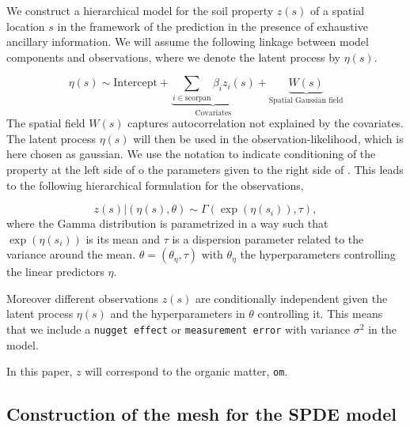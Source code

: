\documentclass[
  a4paper,
]{article}
\begin{document}
We construct a hierarchical model for the soil property \(z(s)\) of a
spatial location \(s\) in the framework of the prediction in the
presence of exhaustive ancillary information. We will assume the
following linkage between model components and observations, where we
denote the latent process by \(\eta(s)\).

\[
\eta(s) \sim {\text{Intercept}} + \underbrace{ \sum_{i\in \text{scorpan}}\beta_i z_i(s)}_{\text{Covariates} } +\underbrace{W(s)}_{\text{Spatial Gaussian field}}
\] The spatial field \(W(s)\) captures autocorrelation not explained by
the covariates. The latent process \(\eta(s)\) will then be used in the
observation-likelihood, which is here chosen as gaussian. We use the
\texttt{\textbar{}} notation to indicate conditioning of the property at
the left side of \texttt{\textbar{}} o the parameters given to the right
side of \texttt{\textbar{}}. This leads to the following hierarchical
formulation for the observations,

\[
z(s) | (\eta(s),\theta) \sim \Gamma(\exp(\eta(s_i)), \tau),
\] where the Gamma distribution is parametrized in a way such that
\(\exp(\eta(s_i))\) is its mean and \(\tau\) is a dispersion parameter
related to the variance around the mean.
\(\theta = (\theta_\eta, \tau)\) with \(\theta_\eta\) the
hyperparameters controlling the linear predictors \(\eta\).

Moreover different observations \(z(s)\) are conditionally independent
given the latent process \(\eta(s)\) and the hyperparameters in
\(\theta\) controlling it. This means that we include a
\texttt{nugget\ effect} or \texttt{measurement\ error} with variance
\(\sigma^2\) in the model.

In this paper, \(z\) will correspond to the organic matter, \texttt{om}.

\hypertarget{construction-of-the-mesh-for-the-spde-model}{%
\subsection{Construction of the mesh for the SPDE
model}\label{construction-of-the-mesh-for-the-spde-model}}
\end{document}
